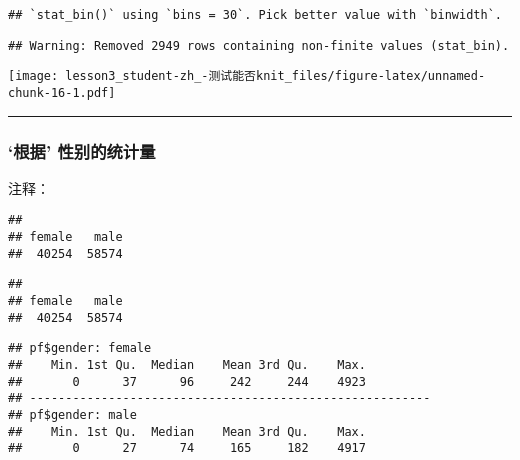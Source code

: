 \documentclass[]{article}
\newenvironment{Shaded}{\begin{snugshade}}{\end{snugshade}}
\newcommand{\KeywordTok}[1]{\textcolor[rgb]{0.13,0.29,0.53}{\textbf{#1}}}
\newcommand{\NormalTok}[1]{#1}
\newcommand{\OperatorTok}[1]{\textcolor[rgb]{0.81,0.36,0.00}{\textbf{#1}}}
\begin{document}
\begin{verbatim}
## `stat_bin()` using `bins = 30`. Pick better value with `binwidth`.
\end{verbatim}

\begin{verbatim}
## Warning: Removed 2949 rows containing non-finite values (stat_bin).
\end{verbatim}

\texttt{[image: lesson3\_student-zh\_-测试能否knit\_files/figure-latex/unnamed-chunk-16-1.pdf]}

\begin{center}\rule{0.5\linewidth}{\linethickness}\end{center}

\hypertarget{-}{%
\subsubsection{`根据' 性别的统计量}\label{-}}

注释：

\begin{Shaded}
\end{Shaded}

\begin{verbatim}
## 
## female   male 
##  40254  58574
\end{verbatim}

\begin{Shaded}
\end{Shaded}

\begin{verbatim}
## 
## female   male 
##  40254  58574
\end{verbatim}

\begin{Shaded}
\end{Shaded}

\begin{verbatim}
## pf$gender: female
##    Min. 1st Qu.  Median    Mean 3rd Qu.    Max. 
##       0      37      96     242     244    4923 
## -------------------------------------------------------- 
## pf$gender: male
##    Min. 1st Qu.  Median    Mean 3rd Qu.    Max. 
##       0      27      74     165     182    4917
\end{verbatim}
\end{document}
